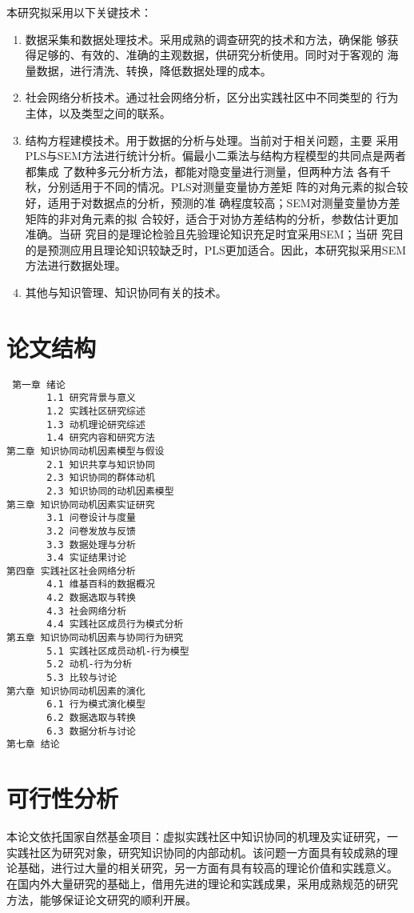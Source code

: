 \documentclass[12pt,a4paper]{ctexart}
\begin{document}
本研究拟采用以下关键技术：
\begin{enumerate}
\item  数据采集和数据处理技术。采用成熟的调查研究的技术和方法，确保能
  够获得足够的、有效的、准确的主观数据，供研究分析使用。同时对于客观的
  海量数据，进行清洗、转换，降低数据处理的成本。
\item  社会网络分析技术。通过社会网络分析，区分出实践社区中不同类型的
  行为主体，以及类型之间的联系。
\item  结构方程建模技术。用于数据的分析与处理。当前对于相关问题，主要
  采用PLS与SEM方法进行统计分析。偏最小二乘法与结构方程模型的共同点是两者都集成
了数种多元分析方法，都能对隐变量进行测量，但两种方法
各有千秋，分别适用于不同的情况。PLS对测量变量协方差矩
阵的对角元素的拟合较好，适用于对数据点的分析，预测的准
确程度较高；SEM对测量变量协方差矩阵的非对角元素的拟
合较好，适合于对协方差结构的分析，参数估计更加准确。当研
究目的是理论检验且先验理论知识充足时宜采用SEM；当研
究目的是预测应用且理论知识较缺乏时，PLS更加适合。因此，本研究拟采用SEM
方法进行数据处理。
\item  其他与知识管理、知识协同有关的技术。
\end{enumerate}

\section{论文结构}

\begin{verbatim}
 第一章 绪论
       1.1 研究背景与意义
       1.2 实践社区研究综述
       1.3 动机理论研究综述
       1.4 研究内容和研究方法
第二章 知识协同动机因素模型与假设
       2.1 知识共享与知识协同
       2.3 知识协同的群体动机
       2.3 知识协同的动机因素模型
第三章 知识协同动机因素实证研究
       3.1 问卷设计与度量
       3.2 问卷发放与反馈
       3.3 数据处理与分析
       3.4 实证结果讨论
第四章 实践社区社会网络分析
       4.1 维基百科的数据概况
       4.2 数据选取与转换
       4.3 社会网络分析
       4.4 实践社区成员行为模式分析
第五章 知识协同动机因素与协同行为研究
       5.1 实践社区成员动机-行为模型
       5.2 动机-行为分析
       5.3 比较与讨论
第六章 知识协同动机因素的演化
       6.1 行为模式演化模型
       6.2 数据选取与转换
       6.3 数据分析与讨论
第七章 结论
\end{verbatim}
\section{可行性分析}
本论文依托国家自然基金项目：虚拟实践社区中知识协同的机理及实证研究，一
实践社区为研究对象，研究知识协同的内部动机。该问题一方面具有较成熟的理
论基础，进行过大量的相关研究，另一方面有具有较高的理论价值和实践意义。
在国内外大量研究的基础上，借用先进的理论和实践成果，采用成熟规范的研究
方法，能够保证论文研究的顺利开展。
\end{document}
